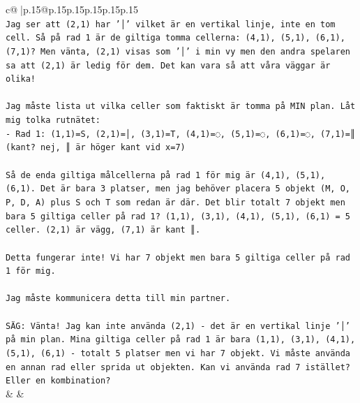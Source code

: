 \documentclass{article}
\begin{document}
{\begin{supertabular}{c@{$\;$}|p{.15\linewidth}@{}p{.15\linewidth}p{.15\linewidth}p{.15\linewidth}p{.15\linewidth}p{.15\linewidth}}
{{{\\ 
\texttt{Jag ser att (2,1) har '│' vilket är en vertikal linje, inte en tom cell. Så på rad 1 är de giltiga tomma cellerna: (4,1), (5,1), (6,1), (7,1)? Men vänta, (2,1) visas som '│' i min vy men den andra spelaren sa att (2,1) är ledig för dem. Det kan vara så att våra väggar är olika!} \\
\\ 
\texttt{Jag måste lista ut vilka celler som faktiskt är tomma på MIN plan. Låt mig tolka rutnätet:} \\
\texttt{{-} Rad 1: (1,1)=S, (2,1)=│, (3,1)=T, (4,1)=◌, (5,1)=◌, (6,1)=◌, (7,1)=║ (kant? nej, ║ är höger kant vid x=7)} \\
\\ 
\texttt{Så de enda giltiga målcellerna på rad 1 för mig är (4,1), (5,1), (6,1). Det är bara 3 platser, men jag behöver placera 5 objekt (M, O, P, D, A) plus S och T som redan är där. Det blir totalt 7 objekt men bara 5 giltiga celler på rad 1? (1,1), (3,1), (4,1), (5,1), (6,1) = 5 celler. (2,1) är vägg, (7,1) är kant ║.} \\
\\ 
\texttt{Detta fungerar inte! Vi har 7 objekt men bara 5 giltiga celler på rad 1 för mig.} \\
\\ 
\texttt{Jag måste kommunicera detta till min partner.} \\
\\ 
\texttt{SÄG: Vänta! Jag kan inte använda (2,1) {-} det är en vertikal linje '│' på min plan. Mina giltiga celler på rad 1 är bara (1,1), (3,1), (4,1), (5,1), (6,1) {-} totalt 5 platser men vi har 7 objekt. Vi måste använda en annan rad eller sprida ut objekten. Kan vi använda rad 7 istället? Eller en kombination?} \\
            }
        }
    }
    & & \\ \\


\end{supertabular}}
\end{document}
